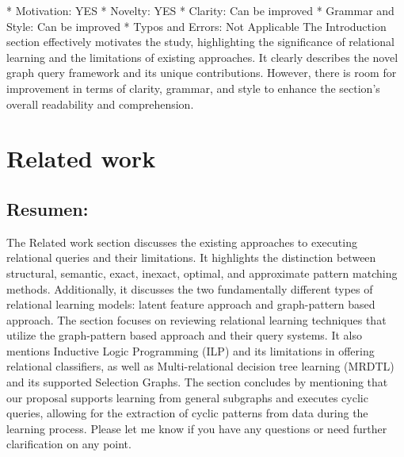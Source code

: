 \documentclass{article}%
\begin{document}
* Motivation: YES\newline%
* Novelty: YES\newline%
* Clarity: Can be improved\newline%
* Grammar and Style: Can be improved\newline%
* Typos and Errors: Not Applicable\newline%
\newline%
The Introduction section effectively motivates the study, highlighting the significance of relational learning and the limitations of existing approaches. It clearly describes the novel graph query framework and its unique contributions. However, there is room for improvement in terms of clarity, grammar, and style to enhance the section's overall readability and comprehension.

%
\clearpage%
\section{Related work}%
\label{sec:Relatedwork}%
\subsection{Resumen:}%
\label{subsec:Resumen}%
The Related work section discusses the existing approaches to executing relational queries and their limitations. It highlights the distinction between structural, semantic, exact, inexact, optimal, and approximate pattern matching methods. Additionally, it discusses the two fundamentally different types of relational learning models: latent feature approach and graph{-}pattern based approach. The section focuses on reviewing relational learning techniques that utilize the graph{-}pattern based approach and their query systems. It also mentions Inductive Logic Programming (ILP) and its limitations in offering relational classifiers, as well as Multi{-}relational decision tree learning (MRDTL) and its supported Selection Graphs. The section concludes by mentioning that our proposal supports learning from general subgraphs and executes cyclic queries, allowing for the extraction of cyclic patterns from data during the learning process.\newline%
\newline%
Please let me know if you have any questions or need further clarification on any point.

%
\end{document}
